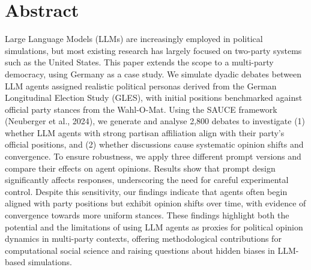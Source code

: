 

\chapter*{Abstract}
\label{chap:abstract}

Large Language Models (LLMs) are increasingly employed in political simulations, but most existing research has largely focused on two-party systems such as the United States. This paper extends the scope to a multi-party democracy, using Germany as a case study. We simulate dyadic debates between LLM agents assigned realistic political personas derived from the German Longitudinal Election Study (GLES), with initial positions benchmarked against official party stances from the Wahl-O-Mat. Using the SAUCE framework (Neuberger et al., 2024), we generate and analyse 2,800 debates to investigate (1) whether LLM agents with strong partisan affiliation align with their party’s official positions, and (2) whether discussions cause systematic opinion shifts and convergence. To ensure robustness, we apply three different prompt versions and compare their effects on agent opinions. Results show that prompt design significantly affects responses, underscoring the need for careful experimental control. Despite this sensitivity, our findings indicate that agents often begin aligned with party positions but exhibit opinion shifts over time, with evidence of convergence towards more uniform stances. These findings highlight both the potential and the limitations of using LLM agents as proxies for political opinion dynamics in multi-party contexts, offering methodological contributions for computational social science and raising questions about hidden biases in LLM-based simulations.